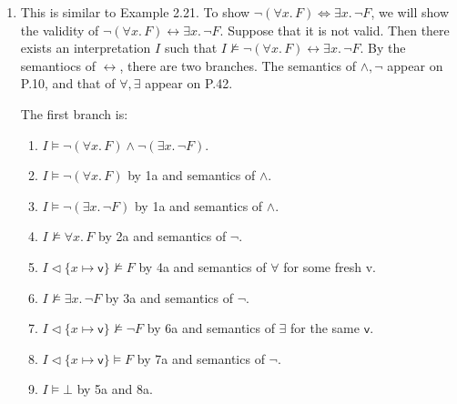 \begin{exer}[2.3]
    $ $
    \begin{enumerate}[label=(\alph*)]
        \item %
            This is similar to Example 2.21.
            To show $\neg(\forall x.\, F) \Leftrightarrow \exists x.\, \neg F$, we will show the validity of $\neg(\forall x.\, F) \leftrightarrow \exists x.\, \neg F$.
            Suppose that it is not valid.
            Then there exists an interpretation $I$ such that $I \not\models \neg(\forall x.\, F) \leftrightarrow \exists x.\, \neg F$.
            By the semantiocs of $\leftrightarrow$, there are two branches.
            The semantics of $\land, \neg$ appear on P.10, and that of $\forall, \exists$ appear on P.42.

            The first branch is:
            \begin{enumerate}[label=\arabic*a.]
                \item %
                    $I \models \neg(\forall x.\, F) \land \neg(\exists x.\, \neg F)$.
                \item %
                    $I \models \neg(\forall x.\, F)$ by 1a and semantics of $\land$.
                \item %
                    $I \models \neg(\exists x.\, \neg F)$ by 1a and semantics of $\land$.
                \item %
                    $I \not\models \forall x.\, F$ by 2a and semantics of $\neg$.
                \item %
                    $I \vartriangleleft \{ x \mapsto \textsf{v} \} \not\models F$ by 4a and semantics of $\forall$ for some fresh \textsf{v}.
                \item %
                    $I \not \models \exists x.\, \neg F$ by 3a and semantics of $\neg$.
                \item %
                    $I \vartriangleleft \{ x \mapsto \textsf{v} \} \not\models \neg F$ by 6a and semantics of $\exists$ for the same $\textsf{v}$.
                \item %
                    $I \vartriangleleft \{ x \mapsto \textsf{v} \} \models F$ by 7a and semantics of $\neg$.
                \item %
                    $I \models \bot$ by 5a and 8a.
            \end{enumerate}


\end{enumerate}
\end{exer}

